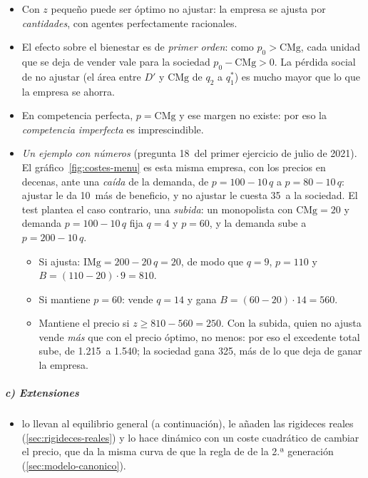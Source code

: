 \documentclass[11pt]{article}
\begin{document}
\begin{itemize}
\item Con $z$ pequeño puede ser óptimo no ajustar: la empresa se ajusta por \emph{cantidades}, con agentes perfectamente racionales.
\item El efecto sobre el bienestar es de \emph{primer orden}: como $p_0>\mathrm{CMg}$, cada unidad que se deja de vender vale para la sociedad $p_0-\mathrm{CMg}>0$. La pérdida social de no ajustar (el área entre $D'$ y $\mathrm{CMg}$ de $q_2$ a $q^*_1$) es mucho mayor que lo que la empresa se ahorra.
\item En competencia perfecta, $p=\mathrm{CMg}$ y ese margen no existe: por eso la \emph{competencia imperfecta} es imprescindible.
\item \emph{Un ejemplo con números} (pregunta 18~del primer ejercicio de julio de 2021). El gráfico~\ref{fig:costes-menu} es esta misma empresa, con los precios en decenas, ante una \emph{caída} de la demanda, de $p=100-10\,q$ a $p=80-10\,q$: ajustar le da 10~más de beneficio, y no ajustar le cuesta 35~a la sociedad. El test plantea el caso contrario, una \emph{subida}: un monopolista con $\mathrm{CMg}=20$ y demanda $p=100-10\,q$ fija $q=4$ y $p=60$, y la demanda sube a $p=200-10\,q$.
  \begin{itemize}
  \item Si ajusta: $\mathrm{IMg}=200-20\,q=20$, de modo que $q=9$, $p=110$ y $B=(110-20)\cdot 9=810$.
  \item Si mantiene $p=60$: vende $q=14$ y gana $B=(60-20)\cdot 14=560$.
  \item Mantiene el precio si $z\geq 810-560=250$. Con la subida, quien no ajusta vende \emph{más} que con el precio óptimo, no menos: por eso el excedente total sube, de 1.215~a 1.540; la sociedad gana 325, más de lo que deja de ganar la empresa.
  \end{itemize}
\end{itemize}

\subparagraph{c) Extensiones}

\begin{itemize}
\item \textcite{BlanchardKiyotaki1987Monopolistic} lo llevan al equilibrio general (a continuación), \textcite{BallRomer1990Real} le añaden las rigideces reales (\ref{sec:rigideces-reales}) y \textcite{Rotemberg1982Monopolistic} lo hace dinámico con un coste cuadrático de cambiar el precio, que da la misma curva de  que la regla de  de la 2.ª generación (\ref{sec:modelo-canonico}).
\end{itemize}
\end{document}
